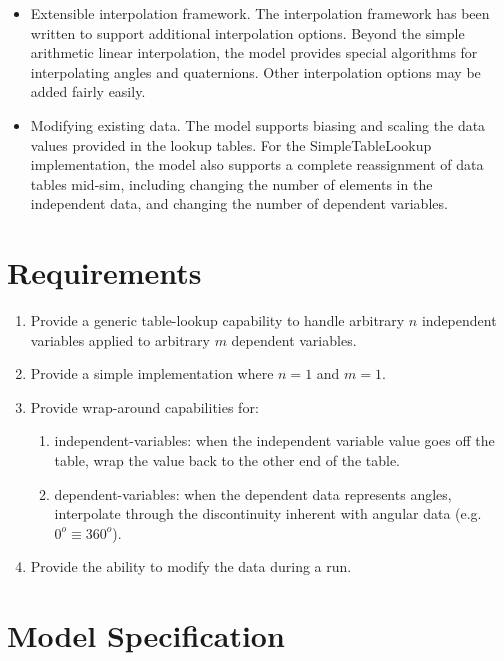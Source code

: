 \documentclass[11pt,fleqn]{report}
\begin{document}
\begin{itemize}
 configured such that their domains are either:
 \begin{itemize}
   \item limited by the specified lower and upper bounds
   \item unbounded by having their values cycle indefinitely, wrapping from the
         lower to upper bound (and vice-versa).
 \end{itemize}
 \item Extensible interpolation framework.  The interpolation framework has
 been written to support additional interpolation options.  Beyond the simple
 arithmetic linear interpolation, the model provides special algorithms for
 interpolating angles and quaternions.  Other interpolation options may be
 added fairly easily.
 \item Modifying existing data.  The model supports biasing and scaling the
 data values provided in the lookup tables. For the SimpleTableLookup
 implementation, the model also supports a complete reassignment of data tables
 mid-sim, including changing the number of elements in the independent data,
 and changing the number of dependent variables.
\end{itemize}


\chapter{Requirements}
\begin{enumerate}
\item  Provide a generic table-lookup capability to handle arbitrary $n$
 independent variables applied to arbitrary $m$ dependent variables.
\item  Provide a simple implementation where $n=1$ and $m=1$.
\item Provide wrap-around capabilities for:
 \begin{enumerate}
 \item independent-variables: when the independent variable value goes off the
 table, wrap the value back to the other end of the table.
 \item dependent-variables: when the dependent data represents angles,
 interpolate through the discontinuity inherent with angular data (e.g. $0^o
 \equiv 360^o$).
 \end{enumerate}
 \item Provide the ability to modify the data during a run.
\end{enumerate}

\chapter{Model Specification} \label{sec:Model_spec}
\end{document}
